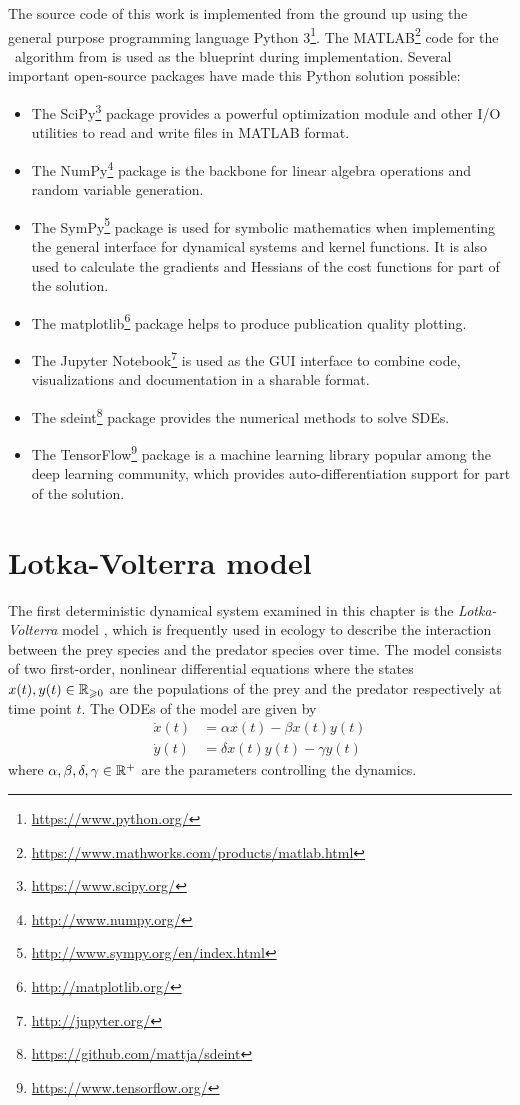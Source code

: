 The source code of this work is implemented from the ground up using the general purpose programming language Python 3\footnote{\url{https://www.python.org/}}.
The MATLAB\footnote{\url{https://www.mathworks.com/products/matlab.html}} code for the \algovgmgp\ algorithm from \cite{gorbach2017scalable} is used as the blueprint during implementation.
Several important open-source packages have made this Python solution possible:
\begin{itemize}
    \item The SciPy\footnote{\url{https://www.scipy.org/}} package provides a powerful optimization module and other I/O utilities to read and write files in MATLAB format.
    \item The NumPy\footnote{\url{http://www.numpy.org/}} package is the backbone for linear algebra operations and random variable generation.
    \item The SymPy\footnote{\url{http://www.sympy.org/en/index.html}} package is used for symbolic mathematics when implementing the general interface for dynamical systems and kernel functions. It is also used to calculate the gradients and Hessians of the cost functions for part of the solution.
    \item The matplotlib\footnote{\url{http://matplotlib.org/}} package helps to produce publication quality plotting.
    \item The Jupyter Notebook\footnote{\url{http://jupyter.org/}} is used as the GUI interface to combine code, visualizations and documentation in a sharable format.
    \item The sdeint\footnote{\url{https://github.com/mattja/sdeint}} package provides the numerical methods to solve SDEs. 
    \item The TensorFlow\footnote{\url{https://www.tensorflow.org/}} package is a machine learning library popular among the deep learning community, which provides auto-differentiation support for part of the solution.
\end{itemize}


\section{Lotka-Volterra model}
\label{sec-lotka-volterra}

The first deterministic dynamical system examined in this chapter is the \emph{Lotka-Volterra} model \citep{lotka1932growth}, which is frequently used in ecology to describe the interaction between the prey species and the predator species over time.
The model consists of two first-order, nonlinear differential equations where the states $x(t), y(t)\in \mathbb{R}_{\geqslant 0}$ are the populations of the prey and the predator respectively at time point $t$.
The ODEs of the model are given by
\begin{align}
    \dot{x}(t) & = \alpha x(t) - \beta x(t)y(t)
    \nonumber
    \\
    \dot{y}(t) & = \delta x(t)y(t) - \gamma y(t)
    \label{eq-lotka-odes}
\end{align}
where $\alpha, \beta, \delta, \gamma \in \mathbb{R}^+$ are the parameters controlling the dynamics.
 

